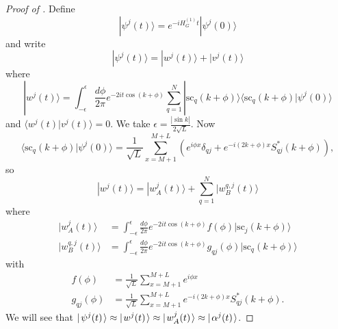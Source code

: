 \documentclass[../thesis-main/thesis-main]{subfiles}
\begin{document}
\begin{proof}[Proof of {}]
Define
\begin{equation}
|\psi^{j}(t)\rangle=e^{-iH_{G}^{(1)}t}|\psi^{j}(0)\rangle
\end{equation}
and write
\begin{equation}
|\psi^{j}(t)\rangle=|w^{j}(t)\rangle+|v^{j}(t)\rangle
\end{equation}
where
\begin{equation}
|w^{j}(t)\rangle=\int_{-\epsilon}^{\epsilon}\frac{d\phi}{2\pi}e^{-2it\cos\left(k+\phi\right)}\sum_{q=1}^{N}|\text{sc}_{q}(k+\phi)\rangle\langle\text{sc}_{q}(k+\phi)|\psi^{j}(0)\rangle
\end{equation}
and $\langle w^{j}(t)|v^{j}(t)\rangle=0$. We take $\epsilon=\frac{\left|\sin k\right|}{2\sqrt{L}}$.
Now \begin{equation}
\langle\text{sc}_{q}(k+\phi)|\psi^{j}(0)\rangle=\frac{1}{\sqrt{L}}\sum_{x=M+1}^{M+L}\left(e^{i\phi x}\delta_{qj}+e^{-i\left(2k+\phi\right)x}S_{qj}^{\ast}(k+\phi)\right),\end{equation}
 so \begin{equation}
|w^{j}(t)\rangle=|w_{A}^{j}(t)\rangle+\sum_{q=1}^{N}|w_{B}^{q,j}(t)\rangle\end{equation}
 where \begin{align*}
|w_{A}^{j}(t)\rangle & = \int_{-\epsilon}^{\epsilon}\frac{d\phi}{2\pi}e^{-2it\cos\left(k+\phi\right)}f(\phi)|\text{sc}_{j}(k+\phi)\rangle\\
|w_{B}^{q,j}(t)\rangle & = \int_{-\epsilon}^{\epsilon}\frac{d\phi}{2\pi}e^{-2it\cos\left(k+\phi\right)}g_{qj}(\phi)|\text{sc}_{q}(k+\phi)\rangle
\end{align*}
with
\begin{align*}
f(\phi) & = \frac{1}{\sqrt{L}}\sum_{x=M+1}^{M+L}e^{i\phi x}\\
g_{qj}(\phi) & = \frac{1}{\sqrt{L}}\sum_{x=M+1}^{M+L}e^{-i\left(2k+\phi\right)x}S_{qj}^{\ast}(k+\phi).\end{align*}
We will see that $|\mspace{2mu} \psi^j(t) \mspace{2mu} \rangle \approx |\mspace{2mu} w^j(t) \mspace{2mu} \rangle \approx |\mspace{2mu} w^j_A(t) \mspace{2mu} \rangle \approx |\mspace{2mu} \alpha^j(t) \mspace{2mu} \rangle$.


\end{proof}
\end{document}
